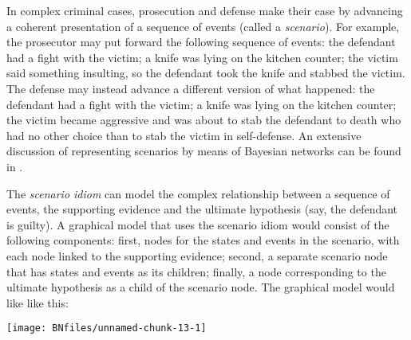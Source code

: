 \documentclass{article}
\begin{document}
In complex criminal cases, prosecution and defense make their case by advancing a coherent presentation of a sequence of events (called a \emph{scenario}). For example, the prosecutor may put forward the following sequence of events: the defendant had a fight with the victim; a knife was lying on the kitchen counter; the victim said something insulting, so the defendant took the knife and stabbed the victim. The defense may instead advance a different version of what happened: 
the defendant had a fight with the victim; a knife was lying on the kitchen counter; the victim became aggressive and was about to stab the defendant to death who had no other choice than to stab the victim in self-defense.  An extensive discussion of representing  scenarios by means of Bayesian networks can be found in 
\citep{vlek2014building}.


The \textit{scenario idiom} can model the complex relationship between a sequence of events, the supporting evidence and the ultimate hypothesis (say, the defendant is guilty). 
A graphical model that uses the scenario idiom would consist of the following components: first, nodes for the states and events 
in the scenario, with each node linked to the supporting evidence; second, a separate scenario node that has states and events as its children; finally, a node corresponding to the ultimate hypothesis as a child 
of the scenario node. The graphical 
model would like like this:

%
\begin{center}\texttt{[image: BNfiles/unnamed-chunk-13-1]} \end{center}



\end{document}

